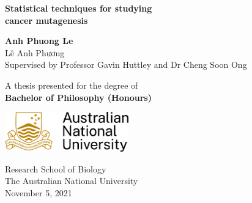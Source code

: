 \begin{titlepage}
    \begin{center}
        \vspace*{1cm}
        \Huge
        \textbf{Statistical techniques for studying \\ cancer mutagenesis} \\

        \LARGE
        \vspace{3cm}
            
        \textbf{Anh Phuong Le} \\
        \normalsize
        \foreignlanguage{vietnamese}{Lê Anh Phương} \\
        \vspace{1cm}
        Supervised by Professor Gavin Huttley and Dr Cheng Soon Ong
            
        \vfill
        
        \large   
        A thesis presented for the degree of\\
        \textbf{Bachelor of Philosophy (Honours)} \\
            
        \vspace{0.8cm}
            
        \includegraphics[width=0.4\textwidth]{graphics/ANU_Primary_Horizontal_GoldBlack.jpg}
            
        \Large
        Research School of Biology\\
        The Australian National University\\
        November 5, 2021 \\
            
    \end{center}
\end{titlepage}